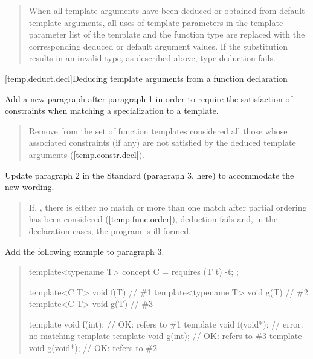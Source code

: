 \begin{quote}
\setcounter{Paras}{4}
\pnum
When all template arguments have been deduced or obtained from default 
template arguments, all uses of template parameters in the template 
parameter list of the template and the function type are replaced with
the corresponding deduced or default argument values. 
% 
If the substitution results in an invalid type, as described above, type 
deduction fails.
% 
\end{quote}


\setcounter{subsubsection}{5}
[temp.deduct.decl]{Deducing template arguments from a function declaration}

Add a new paragraph after paragraph 1 in order to require the
satisfaction of constraints when matching a specialization to a
template.

\begin{quote}
\begin{addedblock}
\setcounter{Paras}{1}
\pnum
Remove from the set of function templates considered all those
whose associated constraints (if any) are not satisfied by the deduced
template arguments (\ref{temp.constr.decl}).
\end{addedblock}
\end{quote}

Update paragraph 2 in the \Cpp Standard (paragraph 3, here) to accommodate 
the new wording.

\begin{quote}
\pnum
If, 
,
there is either no match or more than one match after partial ordering 
has been considered (\ref{temp.func.order}), deduction fails 
and, in the declaration cases, the program is ill-formed.
\end{quote}

Add the following example to paragraph 3.

\begin{quote}
\enterexample
\begin{codeblock}
template<typename T> concept C = requires (T t) { -t; };

template<C T>        void f(T) { } // \#1
template<typename T> void g(T) { } // \#2
template<C T>        void g(T) { } // \#3

template void f(int);   // OK: refers to \#1
template void f(void*); // error: no matching template
template void g(int);   // OK: refers to \#3
template void g(void*); // OK: refers to \#2
\end{codeblock}
\exitexample
\end{quote}
